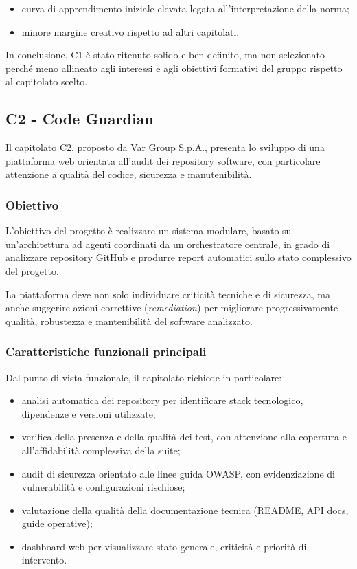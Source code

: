 \documentclass[a4paper,12pt]{article}
\begin{document}
\begin{itemize}
    \item curva di apprendimento iniziale elevata legata all'interpretazione della norma;
    \item minore margine creativo rispetto ad altri capitolati.
\end{itemize}

In conclusione, C1 è stato ritenuto solido e ben definito, ma non selezionato perché meno allineato agli interessi e agli obiettivi formativi del gruppo rispetto al capitolato scelto.

\subsection{C2 - Code Guardian}

Il capitolato C2, proposto da Var Group S.p.A., presenta lo sviluppo di una piattaforma web orientata all'audit dei repository software, con particolare attenzione a qualità del codice, sicurezza e manutenibilità.

\subsubsection{Obiettivo}

L'obiettivo del progetto è realizzare un sistema modulare, basato su un'architettura ad agenti coordinati da un orchestratore centrale, in grado di analizzare repository GitHub e produrre report automatici sullo stato complessivo del progetto.

La piattaforma deve non solo individuare criticità tecniche e di sicurezza, ma anche suggerire azioni correttive (\textit{remediation}) per migliorare progressivamente qualità, robustezza e mantenibilità del software analizzato.

\subsubsection{Caratteristiche funzionali principali}

Dal punto di vista funzionale, il capitolato richiede in particolare:

\begin{itemize}
    \item analisi automatica dei repository per identificare stack tecnologico, dipendenze e versioni utilizzate;
    \item verifica della presenza e della qualità dei test, con attenzione alla copertura e all'affidabilità complessiva della suite;
    \item audit di sicurezza orientato alle linee guida OWASP, con evidenziazione di vulnerabilità e configurazioni rischiose;
    \item valutazione della qualità della documentazione tecnica (README, API docs, guide operative);
    \item dashboard web per visualizzare stato generale, criticità e priorità di intervento.
\end{itemize}
\end{document}
